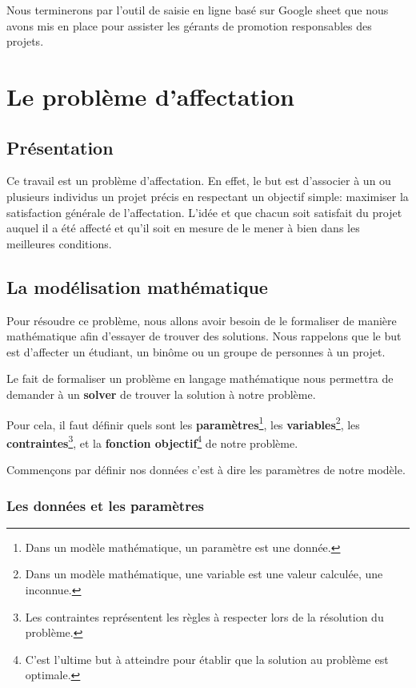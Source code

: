\documentclass[final,poster]{polytech/polytech}
\begin{document}
Nous terminerons par l'outil de saisie en ligne basé sur Google sheet que nous avons mis en place pour assister les gérants de promotion responsables des projets.

\chapter{Le problème d'affectation\label{chap:pb_affectation}}


\section{Présentation\label{sec:pres_affectation}}


Ce travail est un problème d'affectation.
En effet, le but est d'associer à un ou plusieurs individus un projet précis en respectant un objectif simple: maximiser la satisfaction générale de l'affectation.
L'idée et que chacun soit satisfait du projet auquel il a été affecté et qu'il soit en mesure de le mener à bien dans les meilleures conditions.


\section{La modélisation mathématique\label{sec:mod_math}}


Pour résoudre ce problème, nous allons avoir besoin de le formaliser de manière mathématique afin d'essayer de trouver des solutions.
Nous rappelons que le but est d'affecter un étudiant, un binôme ou un groupe de personnes à un projet.

Le fait de formaliser un problème en langage mathématique nous permettra de demander à un \textbf{solver} de trouver la solution à notre problème.

Pour cela, il faut définir quels sont les \textbf{paramètres}\footnote{Dans un modèle mathématique, un paramètre est une donnée.}, les \textbf{ variables}\footnote{Dans un modèle mathématique, une variable est une valeur calculée, une inconnue.}, les \textbf{contraintes}\footnote{Les contraintes représentent les règles à respecter lors de la résolution du problème.}, et la \textbf{fonction objectif}\footnote{C'est l'ultime but à atteindre pour établir que la solution au problème est optimale.} de notre problème.

Commençons par définir nos données c'est à dire les paramètres de notre modèle.

\subsection{Les données et les paramètres\label{sec:donnees_params}}
\end{document}
